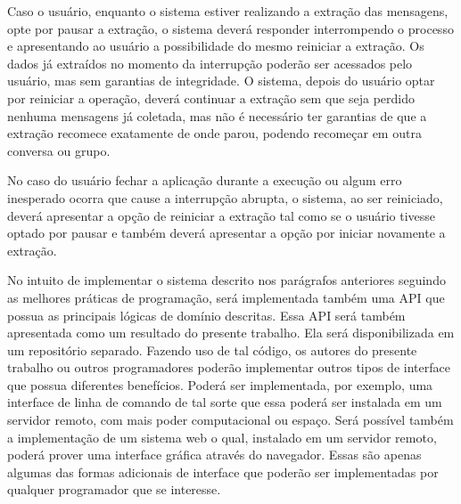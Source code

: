 Caso o usuário, enquanto o sistema estiver realizando a extração das mensagens, opte por pausar a extração, o sistema deverá responder interrompendo o processo e apresentando ao usuário a possibilidade do mesmo reiniciar a extração. Os dados já extraídos no momento da interrupção poderão ser acessados pelo usuário, mas sem garantias de integridade. O sistema, depois do usuário optar por reiniciar a operação, deverá continuar a extração sem que seja perdido nenhuma mensagens já coletada, mas não é necessário ter garantias de que a extração recomece exatamente de onde parou, podendo recomeçar em outra conversa ou grupo. 

No caso do usuário fechar a aplicação durante a execução ou algum erro inesperado ocorra que cause a interrupção abrupta, o sistema, ao ser reiniciado, deverá apresentar a opção de reiniciar a extração tal como se o usuário tivesse optado por pausar e também deverá apresentar a opção por iniciar novamente a extração.





No intuito de implementar o sistema descrito nos parágrafos anteriores seguindo as melhores práticas de programação, será implementada também uma API que possua as principais lógicas de domínio descritas. Essa API será também apresentada como um resultado do presente trabalho. Ela será disponibilizada em um repositório separado. Fazendo uso de tal código, os autores do presente trabalho ou outros programadores poderão implementar outros tipos de interface que possua diferentes benefícios. Poderá ser implementada, por exemplo, uma interface de linha de comando de tal sorte que essa poderá ser instalada em um servidor remoto, com mais poder computacional ou espaço. Será possível também a implementação de um sistema web o qual, instalado em um servidor remoto, poderá prover uma interface gráfica através do navegador. Essas são apenas algumas das formas adicionais de interface que poderão ser implementadas por qualquer programador que se interesse. 


